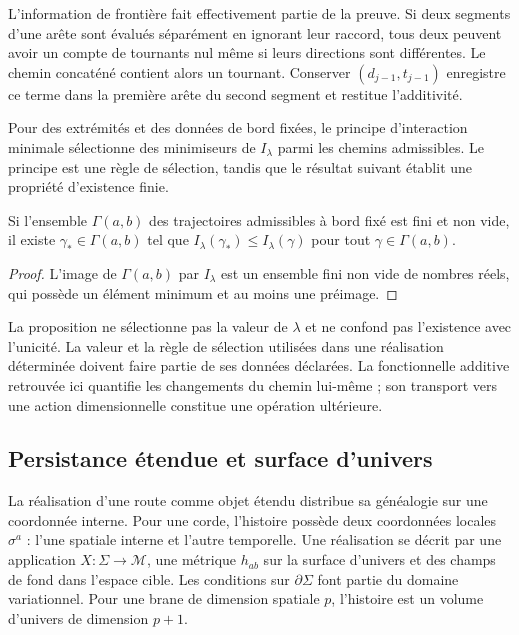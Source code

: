 L’information de frontière fait effectivement partie de la preuve.
Si deux segments d’une arête sont évalués séparément
en ignorant leur raccord, tous deux peuvent avoir un compte
de tournants nul même si leurs directions sont différentes. Le
chemin concaténé contient alors un tournant. Conserver
\((d_{j-1},t_{j-1})\) enregistre ce terme dans la première
arête du second segment et restitue l’additivité.

Pour des extrémités et des données de bord fixées, le principe
d’interaction minimale sélectionne des minimiseurs de
\(I_\lambda\) parmi les chemins admissibles. Le principe
est une règle de sélection, tandis que le résultat
suivant établit une propriété d’existence finie.

\begin{proposition}
Si l’ensemble \(\Gamma(a,b)\) des trajectoires admissibles
à bord fixé est fini et non vide, il existe
\(\gamma_*\in\Gamma(a,b)\) tel que
\(I_\lambda(\gamma_*)\leq I_\lambda(\gamma)\)
pour tout \(\gamma\in\Gamma(a,b)\).
\end{proposition}
\begin{proof}
L’image de \(\Gamma(a,b)\) par \(I_\lambda\) est
un ensemble fini non vide de nombres réels, qui possède
un élément minimum et au moins une préimage.

\end{proof}

La proposition ne sélectionne pas la valeur de \(\lambda\)
et ne confond pas l’existence avec l’unicité. La valeur et la règle
de sélection utilisées dans une réalisation déterminée
doivent faire partie de ses données déclarées. La fonctionnelle
additive retrouvée ici quantifie les changements du chemin
lui-même ; son transport vers une action dimensionnelle constitue
une opération ultérieure.

\subsection{Persistance étendue et surface d’univers}

La réalisation d’une route comme objet étendu distribue
sa généalogie sur une coordonnée interne. Pour une corde,
l’histoire possède deux coordonnées locales \(\sigma^a\) :
l’une spatiale interne et l’autre temporelle. Une réalisation se
décrit par une application \(X:\Sigma\to\mathcal M\), une
métrique \(h_{ab}\) sur la surface d’univers et des champs
de fond dans l’espace cible. Les conditions sur
\(\partial\Sigma\) font partie du domaine variationnel.
Pour une brane de dimension spatiale \(p\), l’histoire
est un volume d’univers de dimension \(p+1\).


